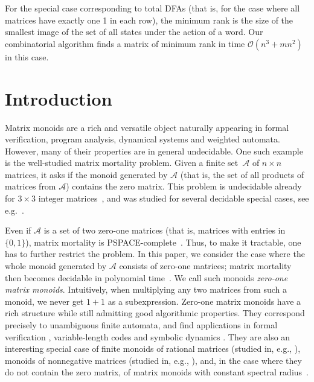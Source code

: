 \documentclass[11pt,a4paper]{amsart}
\newcommand{\OO}{\mathcal{O}}
\newcommand{\Aa}{\mathcal{A}}
\newcommand{\PSPACE}{\textnormal{\textsf{PSPACE}}\xspace}
\theoremstyle{plain}
\theoremstyle{definition}
\theoremstyle{defC}
\theoremstyle{thmC}
\theoremstyle{plain}
\numberwithin{equation}{section}
\begin{document}
For the special case corresponding to total DFAs (that is, for the case where all matrices have exactly one 1 in each row), the minimum rank is the size of the smallest image of the set of all states under the action of a word. Our combinatorial algorithm finds a matrix of minimum rank in time $\OO(n^3 + mn^2)$ in this case.


\section{Introduction}\label{sec-intro}
Matrix monoids are a rich and versatile object naturally appearing in formal verification, program analysis, dynamical systems and weighted automata. 
However, many of their properties are in general undecidable. One such example is the well-studied matrix mortality problem. Given a finite set~$\Aa$ of $n \times n$ matrices, it asks if the monoid generated by $\Aa$ (that is, the set of all products of matrices from $\Aa$) contains the zero matrix. This problem is undecidable already for $3 \times 3$ integer matrices~\cite{Paterson1970}, and was studied for several decidable special cases, see e.g.~\cite{Cassaigne2014,Bell2021,Ryzhikov2024RP}.

Even if $\Aa$ is a set of two zero-one matrices (that is, matrices with entries in~$\{0, 1\}$), matrix mortality is \PSPACE-complete~\cite{Ryzhikov2024RP}. Thus, to make it tractable, one has to further restrict the problem. In this paper, we consider the case where the whole monoid generated by $\Aa$ consists of zero-one matrices;  matrix mortality then becomes decidable in polynomial time~\cite{Kiefer2021}. We call such monoids \emph{zero-one matrix monoids}. Intuitively, when multiplying any two matrices from such a monoid, we never get $1 + 1$ as a subexpression. Zero-one matrix monoids have a rich structure while still admitting good algorithmic properties. They correspond precisely to unambiguous finite automata, and find applications in formal verification \cite{Baier2023}, variable-length codes \cite{Berstel2010} and symbolic dynamics \cite{Lind2021}.
They are also an interesting special case of finite monoids of rational matrices (studied in, e.g., \cite{Mandel1977,Jacob1977,Almeida2009,Bumpus2020}), monoids of nonnegative matrices (studied in, e.g., \cite{Protasov2021,Blondel2015,Wu2023,Gerencser2018}), and, in the case where they do not contain the zero matrix, of matrix monoids with constant spectral radius~\cite{Protasov2017}.
\end{document}
